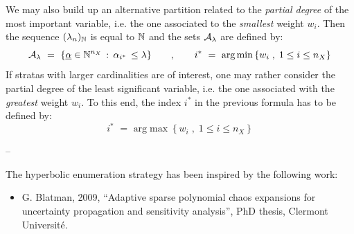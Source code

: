 {We may also build up an alternative partition related to the \emph{partial degree} of the most important variable, i.e. the one associated to the \emph{smallest} weight $w_i$. Then the sequence $(\lambda_n)_{{\mathbb N}}$ is equal to ${\mathbb N}$ and the sets ${\mathcal A}_{\lambda}$ are defined by:
\begin{equation}
  {\mathcal A}_{\lambda} \, \, = \, \, \{\underline{\alpha} \in {\mathbb N}^{n_X} \, : \, \alpha_{i^*} \, \leq \lambda \} \quad \quad , \quad \quad i^* \, \, = \, \, \mbox{arg} \min \left\{w_i \; , \; 1\leq i \leq n_X \right\}
\end{equation}
If stratas with larger cardinalities are of interest, one may rather consider the partial degree of the least significant variable, i.e. the one associated with the \emph{greatest} weight $w_i$. To this end, the index $i^*$ in the previous formula has to be defined by:
\begin{equation}
  i^* \, \, = \, \, \mbox{arg} \max \left\{w_i \; , \; 1\leq i \leq n_X \right\}
\end{equation}




}

  {
    --
  }

              {
                The hyperbolic enumeration strategy has been inspired by the following work:
                \begin{itemize}
                \item G. Blatman, 2009, ``Adaptive sparse polynomial chaos expansions for uncertainty propagation and sensitivity analysis'', PhD thesis, Clermont Universit\'e.
                \end{itemize}
              }
